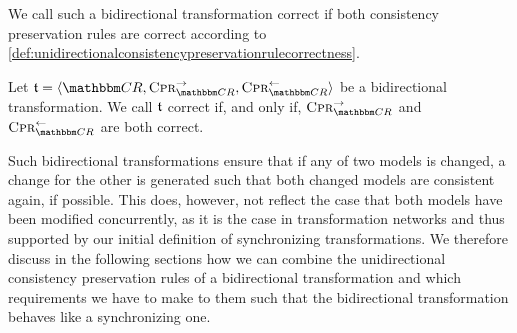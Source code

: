 We call such a bidirectional transformation correct if both consistency preservation rules are correct according to \autoref{def:unidirectionalconsistencypreservationrulecorrectness}. %

\begin{definition}
    \label{def:bidirectionaltransformationcorrectness}
    Let $\transformation{t} = \tupled{\consistencyrelationset{CR}, \consistencypreservationrule{\consistencyrelationset{CR}}^{\rightarrow}, \consistencypreservationrule{\consistencyrelationset{CR}}^{\leftarrow}}$ be a bidirectional transformation.
    We call $\transformation{t}$ correct if, and only if, $\consistencypreservationrule{\consistencyrelationset{CR}}^{\rightarrow}$ and $\consistencypreservationrule{\consistencyrelationset{CR}}^{\leftarrow}$ are both correct. %
\end{definition}

Such bidirectional transformations ensure that if any of two models is changed, a change for the other is generated such that both changed models are consistent again, if possible.
This does, however, not reflect the case that both models have been modified concurrently, as it is the case in transformation networks and thus supported by our initial definition of synchronizing transformations.
We therefore discuss in the following sections how we can combine the unidirectional consistency preservation rules of a bidirectional transformation and which requirements we have to make to them such that the bidirectional transformation behaves like a synchronizing one.

